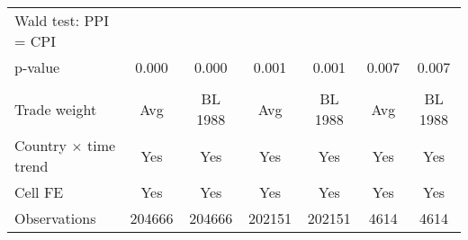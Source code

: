{\begin{tabular}{l*{6}{c}}
Wald test: PPI = CPI&                     &                     &                     &                     &                     &                     \\
\hspace{15pt} p-value&       0.000         &       0.000         &       0.001         &       0.001         &       0.007         &       0.007         \\
\hline \\ Trade weight&         Avg         &     BL 1988         &         Avg         &     BL 1988         &         Avg         &     BL 1988         \\
Country $\times$ time trend&         Yes         &         Yes         &         Yes         &         Yes         &         Yes         &         Yes         \\
Cell FE             &         Yes         &         Yes         &         Yes         &         Yes         &         Yes         &         Yes         \\
Observations        &      204666         &      204666         &      202151         &      202151         &        4614         &        4614         \\
\hline\hline
\end{tabular}
}
